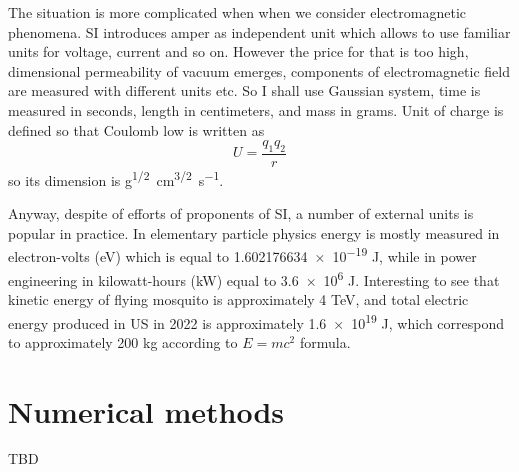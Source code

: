 The situation is more complicated when when we consider electromagnetic phenomena. SI introduces
amper as independent unit which allows to use familiar units for voltage, current and so on.
However the price for that is too high, dimensional permeability of vacuum emerges, components
of electromagnetic field are measured with different units etc. So I shall use Gaussian system,
time is measured in seconds, length in centimeters, and mass in grams. Unit of charge is defined
so that Coulomb low is written as
\[ U= \frac{q_1 q_2}{r} \]
so its dimension is \unit{g^{1/2}.cm^{3/2}.s^{-1}}. 

Anyway, despite of efforts of proponents of SI, a number of external units is popular in practice.
In elementary particle physics energy is mostly measured in electron-volts (\unit{eV}) 
which is equal to  \num{1.602176634e-19} J,
while in
power engineering  in kilowatt-hours (\unit{kW}) equal to \num{3.6e6} J.
Interesting to see that kinetic energy of flying mosquito is approximately 4 \unit{TeV}, and total electric energy 
produced in US in 2022 is approximately \num{1.6e19} J, which correspond to approximately 200 \unit{kg}
according to $ E=m c^2 $ formula.

\section{Numerical methods}
\label{numerical-methods}
TBD
